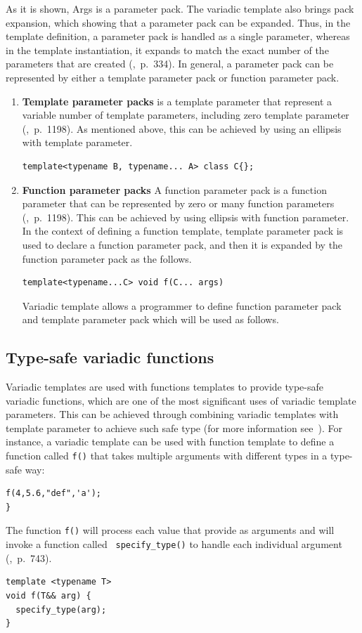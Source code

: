 \documentclass[11pt]{report}
\begin{document}
As it is shown, Args is a parameter pack. The variadic template also brings pack expansion, which showing that a parameter pack can be expanded. Thus, in the template definition, a parameter pack is handled as a single parameter, whereas in the template instantiation, it expands to match the exact number of the parameters that are created (\cite{Prata:2012:Cpp},~p.~334). In general, a parameter pack can be represented by either a template parameter pack or function parameter pack.

\begin{enumerate}
\item \textbf{Template parameter packs} is a template parameter that represent a variable number of template parameters, including zero template parameter (\cite{Prata:2012:Cpp},~p.~1198). As mentioned above, this can be achieved by using an ellipsis with template parameter.
\begin{lstlisting}
template<typename B, typename... A> class C{}; 
\end{lstlisting}


\item \textbf{Function parameter packs} A function parameter pack is a function parameter that can be represented by zero or many function parameters (\cite{Prata:2012:Cpp},~p.~1198). This can be achieved by using ellipsis with function parameter. In the context of defining a function template, template parameter pack is used to declare a function parameter pack, and then it is expanded by the function parameter pack as the follows.
\begin{lstlisting}
template<typename...C> void f(C... args)
\end{lstlisting}

Variadic template allows a programmer to define function parameter pack and template parameter pack which will be used as follows.

\end{enumerate}

\subsection{Type-safe variadic functions}
Variadic templates are used with functions templates to provide type-safe variadic functions, which are one of the most significant uses of variadic template parameters. This can be achieved through combining variadic templates with template parameter to achieve such safe type (for more information see~\cite{Gregor:2007:VTC}). For instance, a variadic template can be used with function template to define a function called \texttt{f()} that takes multiple arguments with different types in a type-safe way:
\begin{lstlisting}
f(4,5.6,"def",'a');
}
\end{lstlisting}
The function \texttt{f()} will process each value that provide as arguments and will invoke a function called \texttt{ specify\_type()} to handle each individual argument (\cite{Gregorie:professionalcpp},~p.~743).
\begin{lstlisting}
template <typename T>
void f(T&& arg) {
  specify_type(arg);
}
\end{lstlisting}
\end{document}
